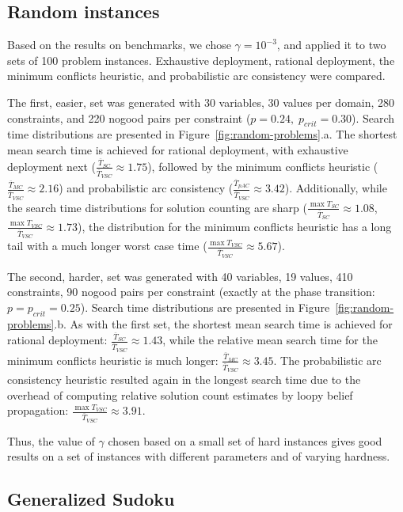 \subsection{Random instances}

Based on the results on benchmarks, we chose $\gamma=10^{-3}$, and
applied it to two sets of 100 problem instances. 
Exhaustive deployment, rational deployment, the
minimum conflicts heuristic, and probabilistic arc consistency
were compared.

The first, easier, set was generated with 30 variables, 30 values per
domain, 280 constraints, and 220 nogood pairs per constraint
($p=0.24,\;p_{crit}=0.30$). Search time distributions are presented in
Figure~\ref{fig:random-problems}.a. The shortest mean search time is
achieved for rational deployment, with exhaustive deployment
next ($\frac {\overline T_{SC}} {\overline T_{VSC}}
\approx 1.75 $), followed by the minimum conflicts heuristic ($\frac
{\overline T_{MC}} {\overline T_{VSC}} \approx 2.16$) and 
probabilistic arc consistency ($\frac {\overline T_{pAC}} {\overline
  T_{VSC}} \approx 3.42$). Additionally,
while the search time distributions for solution counting are sharp
($\frac {\max T_{SC}} {\overline T_{SC}} \approx 1.08$, $\frac {\max
T_{VSC}} {\overline T_{VSC}} \approx 1.73$), the distribution for the
minimum conflicts heuristic has a long tail with a much longer worst
case time ($\frac {\max T_{VSC}} {\overline T_{VSC}} \approx 5.67$).

The second, harder, set was generated with 40 variables, 19 values,
410 constraints, 90 nogood pairs per constraint (exactly at the phase
transition: $p=p_{crit}=0.25$).
Search time distributions are presented in Figure~\ref{fig:random-problems}.b.
As with the first set, the shortest mean search time is achieved for
rational deployment: $\frac {\overline T_{SC}} {\overline T_{VSC}}
\approx 1.43 $,  while the relative mean search time for the minimum
conflicts heuristic is much longer: $\frac {\overline T_{MC}}
{\overline T_{VSC}} \approx 3.45$. The probabilistic arc consistency heuristic
resulted again in the longest search time due to the overhead of computing
relative solution count estimates by loopy belief propagation: $\frac
{\max T_{VSC}} {\overline T_{VSC}} \approx 3.91$. 

Thus, the value of $\gamma$ chosen based on a small set of hard instances
gives good results on a set of instances with different parameters and
of varying hardness.

\subsection{Generalized Sudoku}

